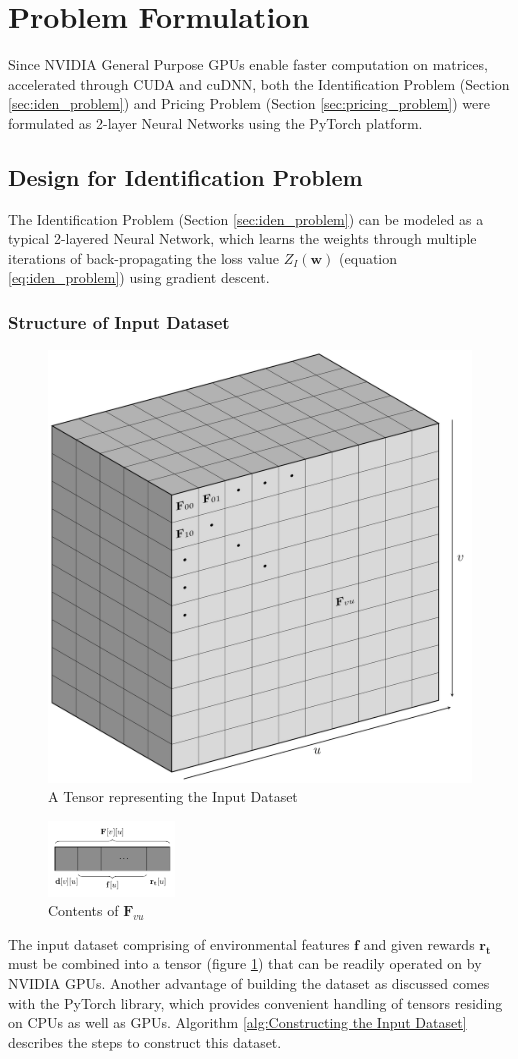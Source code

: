 \documentclass[12pt]{article}
\newcommand{\vect}[1]{\mathbf{#1}}  %
\newcommand{\matr}[1]{\mathbf{#1}}  %
\begin{document}
    \section{Problem Formulation}
    Since NVIDIA General Purpose GPUs enable faster computation on matrices, accelerated through CUDA and cuDNN, both the Identification Problem (Section \ref{sec:iden_problem}) and Pricing Problem (Section \ref{sec:pricing_problem}) were formulated as 2-layer Neural Networks using the PyTorch platform.
    
    \subsection{Design for Identification Problem}
    
    The Identification Problem (Section \ref{sec:iden_problem}) can be modeled as a typical 2-layered Neural Network, which learns the weights through multiple iterations of back-propagating the loss value $Z_I(\matr{w})$ (equation \ref{eq:iden_problem}) using gradient descent.
    
    \subsubsection{Structure of Input Dataset}
    \begin{figure}[h]
        \centering
        \includegraphics[width=.4\textwidth]{weights_input_dataset}
        \caption{A Tensor representing the Input Dataset}
        \label{fig:A Tensor representing the Input Dataset}
    \end{figure}
    
    \begin{figure}
        \centering
        \includegraphics[width=0.3\textwidth]{zoomup_Fuv}
        \caption{Contents of $\vect{F}_{vu}$}
        \label{fig:Contents of Fvu}
    \end{figure}
    The input dataset comprising of environmental features $\vect{f}$ and given rewards $\vect{r_t}$ must be combined into a tensor (figure \ref{fig:A Tensor representing the Input Dataset}) that can be readily operated on by NVIDIA GPUs. Another advantage of building the dataset as discussed comes with the PyTorch library, which provides convenient handling of tensors residing on CPUs as well as GPUs. Algorithm \ref{alg:Constructing the Input Dataset} describes the steps to construct this dataset.
    
\end{document}
